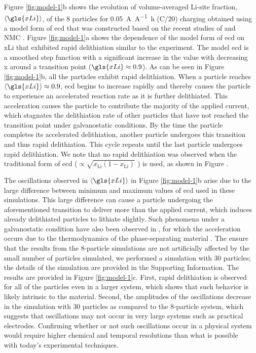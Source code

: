 \documentclass{article}
\begin{document}
Figure \ref{fig:model-1}b shows the evolution of volume-averaged
Li-site fraction, $\left\langle \gls{xLi} \right\rangle$, of the 8
particles for \SI{0.05}{\ampere\per\ampere\hour} (C/20) charging
obtained using a model form of \gls{ecd} that was constructed based on
the recent studies of \nca{} \cite{chueh2021} and NMC \cite{tsai2018,
  mukherjee2017, chiang2020}. Figure \ref{fig:model-1}a shows the
dependence of the model form of \gls{ecd} on \gls{xLi} that exhibited
rapid delithiation similar to the experiment. The model \gls{ecd} is a
smoothed step function with a significant increase in the value with
decreasing x around a transition point ($\gls{xLi}\approx0.9$). As can
be seen in Figure \ref{fig:model-1}b, all the particles exhibit rapid
delithiation. When a particle reaches $\left\langle \gls{xLi}
\right\rangle\approx0.9$, \gls{ecd} begins to increase rapidly and
thereby causes the particle to experience an accelerated reaction rate
as it is further delithiated. This acceleration causes the particle to
contribute the majority of the applied current, which stagnates the
delithiation rate of other particles that have not reached the
transition point under galvanostatic conditions. By the time the
particle completes its accelerated delithiation, another particle
undergoes this transition and thus rapid delithiation. This cycle
repeats until the last particle undergoes rapid delithiation.  We note
that no rapid delithiation was observed when the traditional form of
\gls{ecd} ($\propto\sqrt{{x_{\textrm{Li}}}(1-{x_{\textrm{Li}}})}$
\cite{newman1993, newman1994, newman1995, newman1996}) is used, as
shown in Figure .

The oscillations observed in $\left\langle \gls{xLi} \right\rangle$ in
Figure \ref{fig:model-1}b arise due to the large difference between
minimum and maximum values of \gls{ecd} used in these
simulations. This large difference can cause a particle undergoing the
aforementioned transition to deliver more than the applied current,
which induces already delithiated particles to lithiate slightly. Such
phenomena under a galvanostatic condition have also been observed in
, for which the acceleration occurs due to the
thermodynamics of the phase-separating material
\cite{thornton2015}. The ensure that the results from the 8-particle simulations
are not artificially affected by the small number of particles
simulated, we performed a simulation with 30 particles; the details of
the simulation are provided in the Supporting Information. The results
are provided in Figure \ref{fig:model-1}c. First, rapid delithiation
is observed for all of the particles even in a larger system, which
shows that such behavior is likely intrinsic to the material. Second,
the amplitudes of the oscillations decrease in the simulation with 30
particles as compared to the 8-particle system, which suggests that
oscillations may not occur in very large systems such as practical
electrodes.  Confirming whether or not such oscillations occur in a
physical system would require higher chemical and temporal resolutions
than what is possible with today's experimental techniques.
\end{document}
